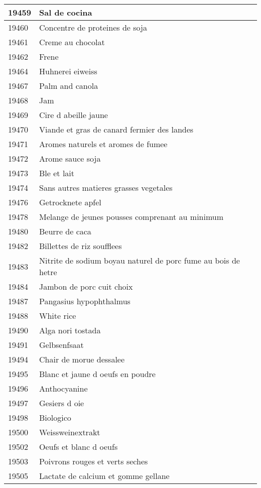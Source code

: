 \begin{longtable}{|l|l|}
19459 & Sal de cocina \\ \hline 
19460 & Concentre de proteines de soja \\ \hline 
19461 & Creme au chocolat \\ \hline 
19462 & Frene \\ \hline 
19464 & Huhnerei eiweiss \\ \hline 
19467 & Palm and canola \\ \hline 
19468 & Jam \\ \hline 
19469 & Cire d abeille jaune \\ \hline 
19470 & Viande et gras de canard fermier des landes \\ \hline 
19471 & Aromes naturels et aromes de fumee \\ \hline 
19472 & Arome sauce soja \\ \hline 
19473 & Ble et lait \\ \hline 
19474 & Sans autres matieres grasses vegetales \\ \hline 
19476 & Getrocknete apfel \\ \hline 
19478 & Melange de jeunes pousses comprenant au minimum \\ \hline 
19480 & Beurre de caca \\ \hline 
19482 & Billettes de riz soufflees \\ \hline 
19483 & Nitrite de sodium boyau naturel de porc fume au bois de hetre \\ \hline 
19484 & Jambon de porc cuit choix \\ \hline 
19487 & Pangasius hypophthalmus \\ \hline 
19488 & White rice \\ \hline 
19490 & Alga nori tostada \\ \hline 
19491 & Gelbsenfsaat \\ \hline 
19494 & Chair de morue dessalee \\ \hline 
19495 & Blanc et jaune d oeufs en poudre \\ \hline 
19496 & Anthocyanine \\ \hline 
19497 & Gesiers d oie \\ \hline 
19498 & Biologico \\ \hline 
19500 & Weissweinextrakt \\ \hline 
19502 & Oeufs et blanc d oeufs \\ \hline 
19503 & Poivrons rouges et verts seches \\ \hline 
19505 & Lactate de calcium et gomme gellane \\ \hline 

\end{longtable}
